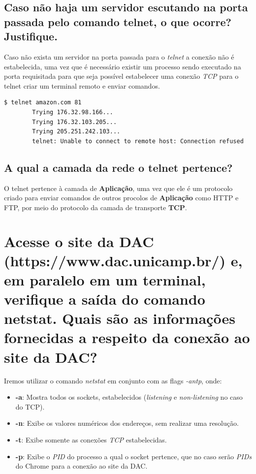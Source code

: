 \documentclass[12pt,a4paper]{report}
\begin{document}
\subsection{Caso não haja um servidor escutando na porta passada pelo comando telnet, o que ocorre? Justifique.}

Caso não exista um servidor na porta passada para o \emph{telnet} a conexão não é estabelecida, uma vez que é necessário existir um processo sendo executado na porta requisitada para que seja possível estabelecer uma conexão \emph{TCP} para o telnet criar um terminal remoto e enviar comandos.
\begin{lstlisting}[language=bash]
        $ telnet amazon.com 81
        Trying 176.32.98.166...
        Trying 176.32.103.205...
        Trying 205.251.242.103...
        telnet: Unable to connect to remote host: Connection refused
\end{lstlisting}



\subsection{A qual a camada da rede o telnet pertence?}
O telnet pertence à camada de \textbf{Aplicação}, uma vez que ele é um protocolo criado para enviar comandos de outros procolos de \textbf{Aplicação} como HTTP e FTP, por meio do protocolo da camada de transporte \textbf{TCP}.


\section{Acesse o site da DAC (https://www.dac.unicamp.br/) e, em paralelo em um terminal, verifique a saída do comando netstat. Quais são as informações fornecidas a respeito da conexão ao site da DAC?}
Iremos utilizar o comando \emph{netstat} em conjunto com as flags \emph{-antp}, onde:
\begin{itemize}
        \item \textbf{-a}: Mostra todos os sockets, estabelecidos (\emph{listening} e \emph{non-listening} no caso do TCP).
        \item \textbf{-n}: Exibe os valores numéricos dos endereços, sem realizar uma resolução.
        \item \textbf{-t}: Exibe somente as conexões \emph{TCP} estabelecidas.
        \item \textbf{-p}: Exibe o \emph{PID} do processo a qual o socket pertence, que no caso serão \emph{PIDs} do Chrome para a conexão ao site da DAC.
\end{itemize}
\end{document}
